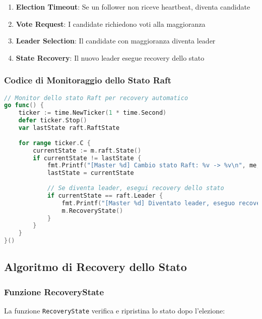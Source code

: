 \documentclass[12pt,a4paper]{article}
\begin{document}
\begin{enumerate}
\item \textbf{Election Timeout}: Se un follower non riceve heartbeat, diventa candidate
\item \textbf{Vote Request}: I candidate richiedono voti alla maggioranza
\item \textbf{Leader Selection}: Il candidate con maggioranza diventa leader
\item \textbf{State Recovery}: Il nuovo leader esegue recovery dello stato
\end{enumerate}

\subsubsection{Codice di Monitoraggio dello Stato Raft}

\begin{lstlisting}[language=go]
// Monitor dello stato Raft per recovery automatico
go func() {
    ticker := time.NewTicker(1 * time.Second)
    defer ticker.Stop()
    var lastState raft.RaftState
    
    for range ticker.C {
        currentState := m.raft.State()
        if currentState != lastState {
            fmt.Printf("[Master %d] Cambio stato Raft: %v -> %v\n", me, lastState, currentState)
            lastState = currentState
            
            // Se diventa leader, esegui recovery dello stato
            if currentState == raft.Leader {
                fmt.Printf("[Master %d] Diventato leader, eseguo recovery dello stato\n", me)
                m.RecoveryState()
            }
        }
    }
}()
\end{lstlisting}

\subsection{Algoritmo di Recovery dello Stato}

\subsubsection{Funzione RecoveryState}

La funzione \texttt{RecoveryState} verifica e ripristina lo stato dopo l'elezione:
\end{document}
